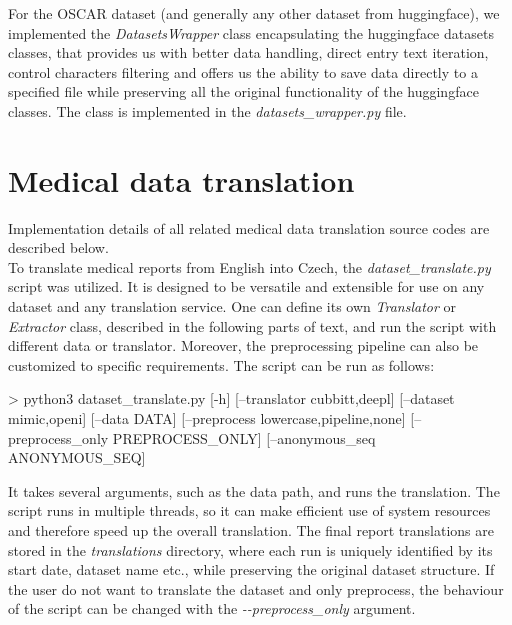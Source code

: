 For the OSCAR dataset (and generally any other dataset from huggingface), we implemented the \textit{DatasetsWrapper} class encapsulating the huggingface datasets classes, that provides us with better data handling, direct entry text iteration, control characters filtering and offers us the ability to save data directly to a specified file while preserving all the original functionality of the huggingface classes. The class is implemented in the \textit{datasets\_wrapper.py} file.

\section{Medical data translation}
Implementation details of all related medical data translation source codes are described below.\\

To translate medical reports from English into Czech, the \textit{dataset\_translate.py} script was utilized. It is designed to be versatile and extensible for use on any dataset and any translation service. One can define its own \textit{Translator} or \textit{Extractor} class, described in the following parts of text, and run the script with different data or translator. Moreover, the preprocessing pipeline can also be customized to specific requirements. The script can be run as follows: \\
\begin{code}
> python3 dataset_translate.py [-h] [--translator {cubbitt,deepl}] 
                               [--dataset {mimic,openi}] 
                               [--data DATA]
                               [--preprocess {lowercase,pipeline,none}] 
                               [--preprocess_only PREPROCESS_ONLY]
                               [--anonymous_seq ANONYMOUS_SEQ]
\end{code}

It takes several arguments, such as the data path, and runs the translation. The script runs in multiple threads, so it can make efficient use of system resources and therefore speed up the overall translation. The final report translations are stored in the \textit{translations} directory, where each run is uniquely identified by its start date, dataset name etc., while preserving the original dataset structure. If the user do not want to translate the dataset and only preprocess, the behaviour of the script can be changed with the \textit{-{}-preprocess\_only} argument.\\

